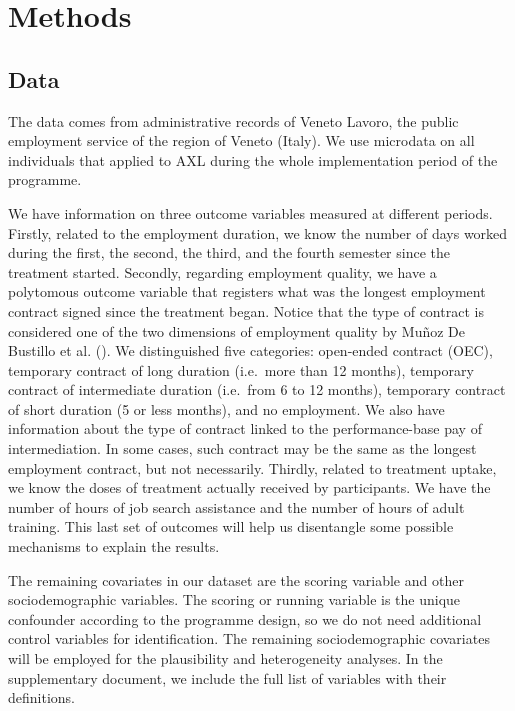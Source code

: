 \documentclass[
  11pt]{article}
\begin{document}
\section{Methods}\label{sec-meth}

\subsection{Data}\label{data}

The data comes from administrative records of Veneto Lavoro, the public
employment service of the region of Veneto (Italy). We use microdata on
all individuals that applied to AXL during the whole implementation
period of the programme.

We have information on three outcome variables measured at different
periods. Firstly, related to the employment duration, we know the number
of days worked during the first, the second, the third, and the fourth
semester since the treatment started. Secondly, regarding employment
quality, we have a polytomous outcome variable that registers what was
the longest employment contract signed since the treatment began. Notice
that the type of contract is considered one of the two dimensions of
employment quality by Muñoz De Bustillo et al.
(). We distinguished five
categories: open-ended contract (OEC), temporary contract of long
duration (i.e.~more than 12 months), temporary contract of intermediate
duration (i.e.~from 6 to 12 months), temporary contract of short
duration (5 or less months), and no employment. We also have information
about the type of contract linked to the performance-base pay of
intermediation. In some cases, such contract may be the same as the
longest employment contract, but not necessarily. Thirdly, related to
treatment uptake, we know the doses of treatment actually received by
participants. We have the number of hours of job search assistance and
the number of hours of adult training. This last set of outcomes will
help us disentangle some possible mechanisms to explain the results.

The remaining covariates in our dataset are the scoring variable and
other sociodemographic variables. The scoring or running variable is the
unique confounder according to the programme design, so we do not need
additional control variables for identification. The remaining
sociodemographic covariates will be employed for the plausibility and
heterogeneity analyses. In the supplementary document, we include the
full list of variables with their definitions.
\end{document}
